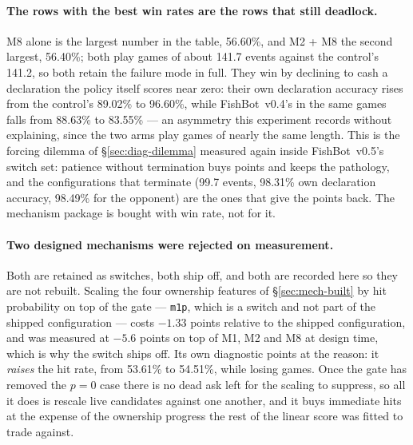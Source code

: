 \documentclass[11pt]{article}
\theoremstyle{definition}
\DeclareRobustCommand{\vfive}{\texorpdfstring{\mbox{FishBot v0.5}}{FishBot v0.5}}
\DeclareRobustCommand{\vfour}{\texorpdfstring{\mbox{FishBot v0.4}}{FishBot v0.4}}
\providecommand{\numAblControlDeclAcc}{89.02}
\providecommand{\numAblControlEvents}{141.2}
\providecommand{\numAblControlOppDeclAcc}{88.63}
\providecommand{\numAblFullDeclAcc}{98.31}
\providecommand{\numAblFullEvents}{99.7}
\providecommand{\numAblFullHit}{53.61}
\providecommand{\numAblFullOppDeclAcc}{98.49}
\providecommand{\numAblMeight}{56.60}
\providecommand{\numAblMeightDeclAcc}{96.60}
\providecommand{\numAblMeightEvents}{141.7}
\providecommand{\numAblMeightOppDeclAcc}{83.55}
\providecommand{\numAblMtwoMeight}{56.40}
\providecommand{\numAblOwnershipPHit}{54.51}
\providecommand{\numAblOwnershipPDelta}{-1.33}
\providecommand{\numMonePReject}{5.6}
\begin{document}
\paragraph{The rows with the best win rates are the rows that still deadlock.}
M8 alone is the largest number in the table, \numAblMeight\%, and M2 + M8 the
second largest, \numAblMtwoMeight\%; both play games of about
\numAblMeightEvents{} events against the control's \numAblControlEvents{}, so both
retain the failure mode in full. They win by declining to cash a declaration the
policy itself scores near zero: their own declaration accuracy rises from the
control's \numAblControlDeclAcc\% to \numAblMeightDeclAcc\%, while \vfour{}'s in
the same games falls from \numAblControlOppDeclAcc\% to
\numAblMeightOppDeclAcc\% --- an asymmetry this experiment records without
explaining, since the two arms play games of nearly the same length. This is the
forcing dilemma of
\S\ref{sec:diag-dilemma} measured again inside \vfive{}'s switch set: patience
without termination buys points and keeps the pathology, and the configurations
that terminate (\numAblFullEvents{} events, \numAblFullDeclAcc\% own declaration
accuracy, \numAblFullOppDeclAcc\% for the opponent) are the ones that give the
points back. The mechanism package is bought with win rate, not for it.

\paragraph{Two designed mechanisms were rejected on measurement.} Both are
retained as switches, both ship off, and both are recorded here so they are not
rebuilt. Scaling the four ownership features of
\S\ref{sec:mech-built} by hit probability on top of the gate --- \texttt{m1p},
which is a switch and not part of the shipped configuration --- costs $\numAblOwnershipPDelta$ points relative to the
shipped configuration, and was measured at $-\numMonePReject$ points on top of
M1, M2 and M8 at design time, which is why the switch ships off. Its own
diagnostic points at the reason: it \emph{raises} the hit rate, from
\numAblFullHit\% to \numAblOwnershipPHit\%, while losing games. Once the gate has
removed the $p = 0$ case there is no dead ask left for the scaling to suppress,
so all it does is rescale live candidates against one another, and it buys
immediate hits at the expense of the ownership progress the rest of the linear
score was fitted to trade against.
\end{document}
